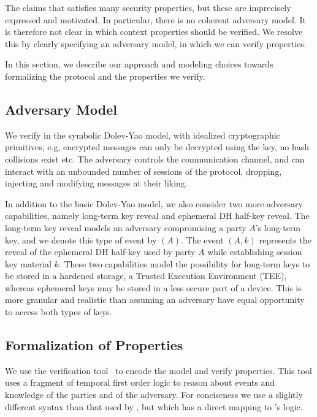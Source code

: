 The \mEdhoc{} \mSpec{} \cite{our-analysis-selander-lake-edhoc-01} claims
that \mEdhoc{} satisfies many security properties, but these are imprecisely
expressed and motivated.
%
In particular, there is no coherent adversary model.
%
It is therefore not clear in which context properties should be verified.
%
We resolve this by clearly specifying an adversary model, in which we can verify
properties.
%

In this section, we describe our approach and modeling choices towards
formalizing the \mEdhoc{} protocol and the properties we verify.
%

\subsection{Adversary Model}\label{sec:threat-model}
We verify \mEdhoc{} in the symbolic Dolev-Yao model, with idealized
cryptographic primitives, e.g, encrypted messages can only be
decrypted using the key, no hash collisions exist etc.
%
The adversary controls the
communication channel, and can interact with an unbounded number of sessions
of the protocol, dropping, injecting and modifying messages at their liking.
%

In addition to the basic Dolev-Yao model, we also consider two more adversary
capabilities, namely long-term key reveal and ephemeral DH half-key reveal.
%
The long-term key reveal models an adversary compromising a party $A$'s
long-term key, and we denote this type of event by \mRevLTK$(A)$.
%
The event \mRevEph$(A, k)$ represents the reveal of the ephemeral DH half-key
used by party $A$ while establishing session key material $k$.
%
These two capabilities model the possibility for long-term keys to be stored in a
hardened storage, a Trusted Execution Environment (TEE), whereas ephemeral keys
may be stored in a less secure part of a device.
%
This is more granular and realistic than assuming an adversary have equal
opportunity to access both types of keys.
%

\subsection{Formalization of Properties}
\label{sec:desired-properties}
%
We use the \mTamarin{} verification
tool~\cite{DBLP:conf/cav/MeierSCB13} to encode the model and verify properties.
%
This tool uses a fragment of temporal first order logic to reason about
events and knowledge of the parties and of the adversary.
%
For conciseness we use a slightly different syntax than
that used by \mTamarin{}, but which has a direct mapping to \mTamarin{}'s logic.
%

